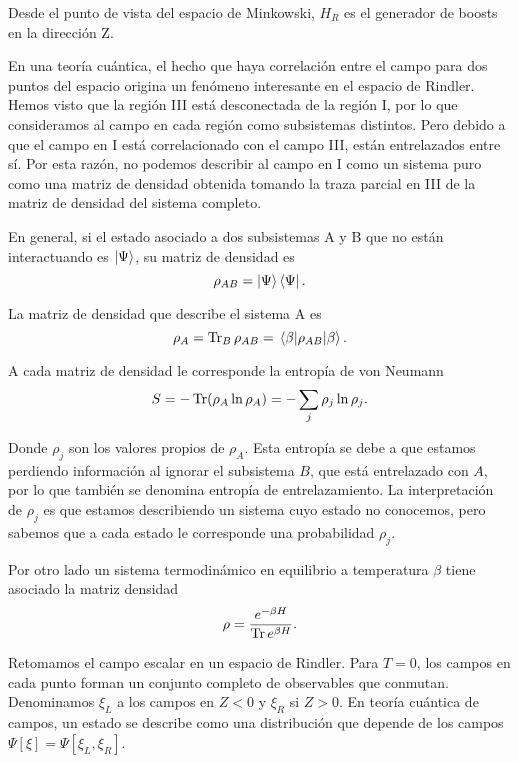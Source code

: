 Desde el punto de vista del espacio de Minkowski, $H_R$ es el generador de boosts en 
la dirección Z.

En una teoría cuántica, el hecho que haya correlación entre el campo para dos puntos
del espacio origina un fenómeno interesante en el espacio de Rindler. 
Hemos visto que la región III está desconectada de la región I, por lo que consideramos
al campo en cada región como subsistemas distintos. Pero debido a que el campo en I está
correlacionado con el campo III, están entrelazados entre sí.
Por esta razón, no podemos describir al campo en I como un sistema puro como una
matriz de densidad obtenida tomando la traza parcial en III de la matriz de densidad
del sistema completo.

En general, si el estado asociado a dos subsistemas A y B que no están interactuando 
es $\ket{\Psi}$, su matriz de densidad es
\begin{equation}
  \rho_{AB}=\ket{\Psi}\bra{\Psi}.
\end{equation}

La matriz de densidad que describe el sistema A es
\begin{equation}
  \rho_{A}=\Tr_B \rho_{AB}=\expval{\rho_{AB}}{\beta}.
\end{equation}
 
A cada matriz de densidad le corresponde la entropía de von Neumann
\begin{equation}
  S=-\Tr (\rho_A \ln \rho_A)=-\sum_j \rho_j \ln \rho_j.
\end{equation}

Donde $\rho_j$ son los valores propios de $\rho_A$.
Esta entropía se debe a que estamos perdiendo información al ignorar el subsistema $B$, que 
está entrelazado con $A$, por lo que también se denomina entropía de entrelazamiento.
La interpretación de $\rho_j$ es que estamos describiendo un sistema cuyo estado no 
conocemos, pero sabemos que a cada estado le corresponde una probabilidad $\rho_j$.

Por otro lado un sistema termodinámico en equilibrio a temperatura $\beta$ tiene 
asociado la matriz densidad 
\begin{equation}
  \rho=\frac{e^{-\beta H}}{\Tr e^{\beta H}}.
\end{equation}

Retomamos el campo escalar en un espacio de Rindler. 
Para $T=0$, los campos en cada punto forman un conjunto completo de observables que 
conmutan. Denominamos $\xi_L$ a los campos en $Z<0$ y $\xi_R$ si $Z>0$.
En teoría cuántica de campos, un estado se describe como una distribución que 
depende de los campos $\Psi[\xi]=\Psi[\xi_L,\xi_R]$.

